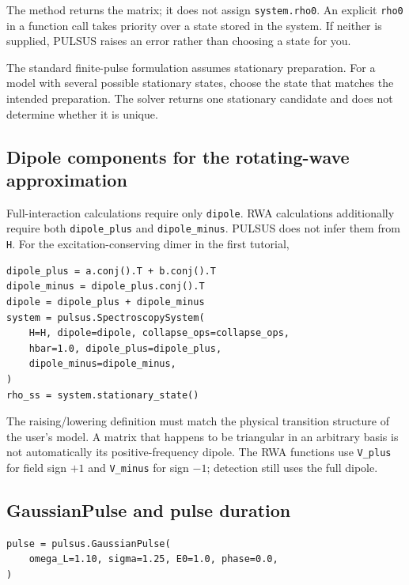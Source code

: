 The method returns the matrix; it does not assign
\texttt{system.rho0}. An explicit \texttt{rho0} in a function call takes
priority over a state stored in the system. If neither is supplied,
PULSUS raises an error rather than choosing a state for you.

The standard finite-pulse formulation assumes stationary preparation.
For a model with several possible stationary states, choose the state
that matches the intended preparation. The solver returns one stationary
candidate and does not determine whether it is unique.

\subsection{Dipole components for the rotating-wave approximation}

Full-interaction calculations require only \texttt{dipole}. RWA
calculations additionally require both \texttt{dipole\_plus} and
\texttt{dipole\_minus}. PULSUS does not infer them from \texttt{H}.
For the excitation-conserving dimer in the first tutorial,
\par\noindent
\begin{minipage}{\linewidth}
\begin{lstlisting}[style=python]
dipole_plus = a.conj().T + b.conj().T
dipole_minus = dipole_plus.conj().T
dipole = dipole_plus + dipole_minus
system = pulsus.SpectroscopySystem(
    H=H, dipole=dipole, collapse_ops=collapse_ops,
    hbar=1.0, dipole_plus=dipole_plus,
    dipole_minus=dipole_minus,
)
rho_ss = system.stationary_state()
\end{lstlisting}
\end{minipage}\par
The raising/lowering definition must match the physical transition
structure of the user's model. A matrix that happens to be triangular in
an arbitrary basis is not automatically its positive-frequency dipole.
The RWA functions use \texttt{V\_plus} for field sign $+1$ and
\texttt{V\_minus} for sign $-1$; detection still uses the full dipole.

\subsection{GaussianPulse and pulse duration}

\par\noindent
\begin{minipage}{\linewidth}
\begin{lstlisting}[style=python]
pulse = pulsus.GaussianPulse(
    omega_L=1.10, sigma=1.25, E0=1.0, phase=0.0,
)
\end{lstlisting}
\end{minipage}\par

